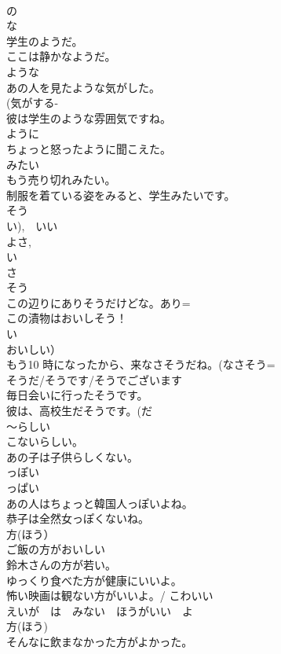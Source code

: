 \documentclass[8pt]{extreport}
\begin{document}
\begin{CJK}{UTF8}{min}
\\	の 
\\	な 
\\	学生のようだ。
\\	ここは静かなようだ。 
\\	ような	
\\	あの人を見たような気がした。
\\	(気がする- 
\\	彼は学生のような雰囲気ですね。 
\\	ように 
\\	ちょっと怒ったように聞こえた。
\\	みたい	
\\	もう売り切れみたい。
\\	制服を着ている姿をみると、学生みたいです。
\\	そう	
\\	い),　いい
\\	よさ, 
\\	い 
\\	さ 
\\	そう
\\	この辺りにありそうだけどな。あり=
\\	この漬物はおいしそう！
\\	い
\\	おいしい）
\\	もう10 時になったから、来なさそうだね。(なさそう= 
\\	そうだ/そうです/そうでございます	
\\	毎日会いに行ったそうです。
\\	彼は、高校生だそうです。(だ 
\\	～らしい	
\\	こないらしい。
\\	あの子は子供らしくない。
\\	っぽい
\\	っぱい 
\\	あの人はちょっと韓国人っぽいよね。
\\	恭子は全然女っぽくないね。
\\	方(ほう）
\\	ご飯の方がおいしい 
\\	鈴⽊さんの方が若い。
\\	ゆっくり食べた方が健康にいいよ。
\\	怖い映画は観ない方がいいよ。/ こわいい
\\	えいが　は　みない　ほうがいい　よ	
\\	方(ほう) 
\\	そんなに飲まなかった方がよかった。 

\end{CJK}
\end{document}
